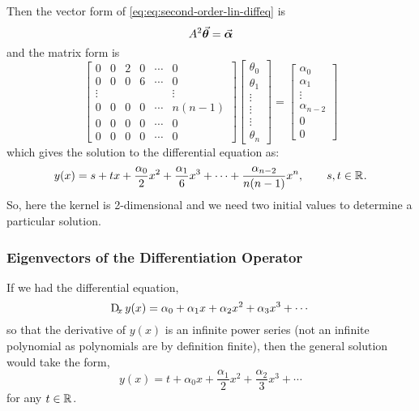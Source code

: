 \documentclass[MathsNotesBase.tex]{subfiles}
\begin{document}
{		Then the vector form of \autoref{eq:eq:second-order-lin-diffeq} is
		\begin{equation}
			A^2 \vec{\bm{\theta}} = \vec{\bm{\alpha}}
		\end{equation}
		and the matrix form is
		\begin{equation}
			\begin{bmatrix}
			0 & 0 & 2 & 0 & \cdots & 0\\
			0 & 0 & 0 & 6 & \cdots & 0\\
			\vdots &  &  &  &  & \vdots\\
			0 & 0 & 0 & 0 & \cdots & n(n-1)\\
			0 & 0 & 0 & 0 & \cdots & 0\\
			0 & 0 & 0 & 0 & \cdots & 0
			\end{bmatrix}\begin{bmatrix}\theta_0\\\theta_1\\\vdots\\\vdots\\\vdots\\\theta_n\end{bmatrix} = \begin{bmatrix}\alpha_0\\\alpha_1\\\vdots\\\alpha_{n-2}\\0\\0\end{bmatrix}
		\end{equation}
		which gives the solution to the differential equation as:
		\begin{equation}\label{eq:general-first-order-lin-diff-eq-soln}
		y(x) = s + tx + \frac{\alpha_0}{2} x^2 + \frac{\alpha_1}{6} x^3 + \cdots + \frac{\alpha_{n-2}}{n(n-1)} x^n, \hspace{20pt} s,t \in \mathbb{R}^{}.
		\end{equation}
		So, here the kernel is 2-dimensional and we need two initial values to determine a particular solution.
		
		\bigskip
		\subsubsection{Eigenvectors of the Differentiation Operator}
		\bigskip
		If we had the differential equation,
		\begin{equation}
		\Dif_x y(x) = \alpha_0 + \alpha_1 x + \alpha_2 x^2 + \alpha_3 x^3 + \cdots
		\end{equation}
		so that the derivative of $y(x)$ is an infinite power series (not an infinite polynomial as polynomials are by definition finite), then the general solution would take the form,
		\begin{equation}
			y(x) = t + \alpha_0 x + \frac{\alpha_1}{2} x^2 + \frac{\alpha_2}{3} x^3 + \cdots
		\end{equation}
		for any ${ t \in \mathbb{R}^{} }$.
		
}
\end{document}
